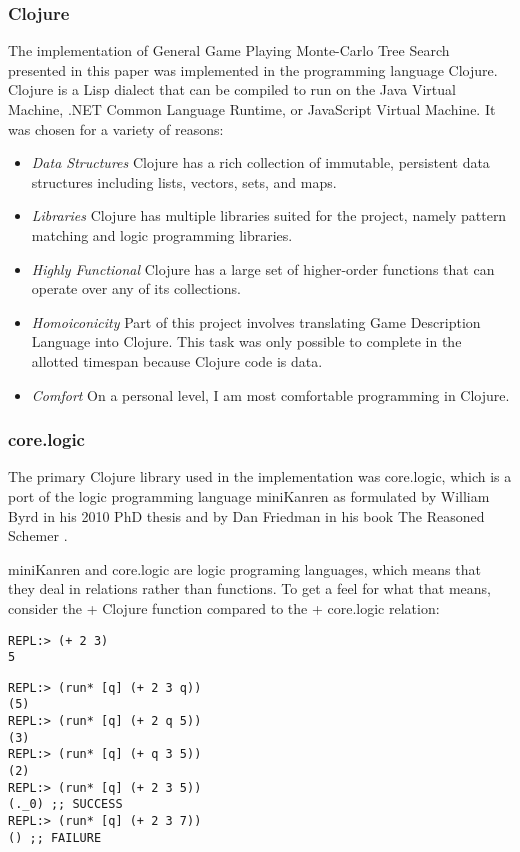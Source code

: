 \documentclass[letterpaper]{article}
\begin{document}
\subsubsection{Clojure}
The implementation of General Game Playing Monte-Carlo Tree Search presented in this paper was implemented in the programming language Clojure. Clojure is a Lisp dialect that can be compiled to run on the Java Virtual Machine, .NET Common Language Runtime, or JavaScript Virtual Machine. It was chosen for a variety of reasons:
\begin{itemize}

\item \emph{Data Structures} Clojure has a rich collection of immutable, persistent data structures including lists, vectors, sets, and maps.
\item \emph{Libraries} Clojure has multiple libraries suited for the project, namely pattern matching and logic programming libraries.
\item \emph{Highly Functional} Clojure has a large set of higher-order functions that can operate over any of its collections.
\item \emph{Homoiconicity} Part of this project involves translating Game Description Language into Clojure. This task was only possible to complete in the allotted timespan because Clojure code is data.
\item \emph{Comfort} On a personal level, I am most comfortable programming in Clojure.
\end{itemize}
\subsubsection{core.logic}

The primary Clojure library used in the implementation was core.logic, which is a port of the logic programming language miniKanren as formulated by William Byrd in his 2010 PhD thesis \cite{byrd2010relational} and by Dan Friedman in his book The Reasoned Schemer \cite{reasonedschemer}.

miniKanren and core.logic are logic programing languages, which means that they deal in relations rather than functions. To get a feel for what that means, consider the + Clojure function compared to the + core.logic relation:

\begin{lstlisting}[frame=single, caption=The + function]
REPL:> (+ 2 3)
5
\end{lstlisting}

\begin{lstlisting}[frame=single, caption=The + relation]
REPL:> (run* [q] (+ 2 3 q))
(5)
REPL:> (run* [q] (+ 2 q 5))
(3)
REPL:> (run* [q] (+ q 3 5))
(2)
REPL:> (run* [q] (+ 2 3 5))
(._0) ;; SUCCESS
REPL:> (run* [q] (+ 2 3 7))
() ;; FAILURE
\end{lstlisting}
\end{document}
